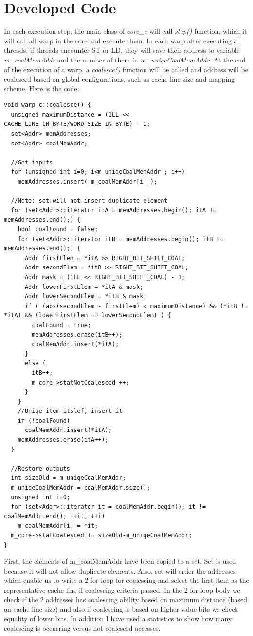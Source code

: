 \documentclass{article}
\begin{document}
\section{Developed Code}
In each execution step, the main class of \emph{core\_c} will call \emph{step()} function, which it will call all warp in the core and execute them. In each warp after executing all threads, if threads encounter ST or LD, they will save their address to variable \emph{m\_coalMemAddr} and the number of them in \emph{m\_uniqeCoalMemAddr}. At the end of the execution of a warp, a \emph{coalesce()} function will be called and address will be coalesced based on global configurations, such as cache line size and mapping scheme. Here is the code:
\begin{lstlisting}
void warp_c::coalesce() {
  unsigned maximumDistance = (1LL << CACHE_LINE_IN_BYTE/WORD_SIZE_IN_BYTE) - 1;
  set<Addr> memAddresses;
  set<Addr> coalMemAddr;

  //Get inputs
  for (unsigned int i=0; i<m_uniqeCoalMemAddr ; i++)
    memAddresses.insert( m_coalMemAddr[i] );

  //Note: set will not insert duplicate element
  for (set<Addr>::iterator itA = memAddresses.begin(); itA != memAddresses.end();) {
    bool coalFound = false;
    for (set<Addr>::iterator itB = memAddresses.begin(); itB != memAddresses.end();) {
      Addr firstElem = *itA >> RIGHT_BIT_SHIFT_COAL;
      Addr secondElem = *itB >> RIGHT_BIT_SHIFT_COAL;
      Addr mask = (1LL << RIGHT_BIT_SHIFT_COAL) - 1;
      Addr lowerFirstElem = *itA & mask;
      Addr lowerSecondElem = *itB & mask;
      if ( (abs(secondElem - firstElem) < maximumDistance) && (*itB != *itA) && (lowerFirstElem == lowerSecondElem) ) {
        coalFound = true;
        memAddresses.erase(itB++);
        coalMemAddr.insert(*itA);
      }
      else {
        itB++;
		m_core->statNotCoalesced ++;
      }
    }
    //Uniqe item itslef, insert it
    if (!coalFound)
      coalMemAddr.insert(*itA);
    memAddresses.erase(itA++);
  }

  //Restore outputs
  int sizeOld = m_uniqeCoalMemAddr;
  m_uniqeCoalMemAddr = coalMemAddr.size();
  unsigned int i=0;
  for (set<Addr>::iterator it = coalMemAddr.begin(); it != coalMemAddr.end(); ++it, ++i) 
    m_coalMemAddr[i] = *it;
  m_core->statCoalesced += sizeOld-m_uniqeCoalMemAddr;
}
\end{lstlisting}
First, the elements of m\_coalMemAddr have been copied to a set. Set is used because it will not allow duplicate elements. Also, set will order the addresses which enable us to write a 2 for loop for coalescing and select the first item as the representative cache line if coalescing criteria passed. In the 2 for loop body we check if the 2 addresses has coalescing ability based on maximum distance (based on cache line size) and also if coalescing is based on higher value bits we check equality of lower bits.
In addition I have used a statistics to show how many coalescing is occurring versus not coalesced accesses.
\end{document}
